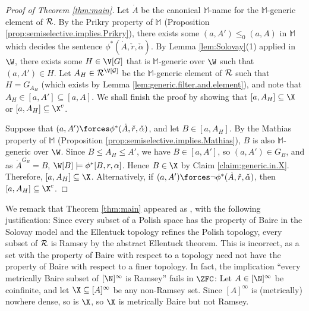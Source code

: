 \documentclass[11pt,reqno]{amsart}
\begin{document}
\begin{proof}[Proof of Theorem \ref{thm:main}]
    Let $\dot{A}$ be the canonical $\mathbb{M}$-name for the $\mathbb{M}$-generic element of $\cal{R}$. By the Prikry property of $\mathbb{M}$ (Proposition \ref{prop:semiselective.implies.Prikry}), there exists some $(a,A') \leq_0 (a,A)$ in $\mathbb{M}$ which decides the sentence $\phi^*(\dot{A},\check{r},\check{\alpha})$. By Lemma \ref{lem:Solovay}(1) applied in $\W$, there exists some $H \in \V[G]$ that is $\mathbb{M}$-generic over $\W$ such that $(a,A') \in H$. Let $A_H \in \cal{R}^{\V[G]}$ be the $\mathbb{M}$-generic element of $\cal{R}$ such that $H = G_{A_H}$ (which exists by Lemma \ref{lem:generic.filter.and.element}), and note that $A_H \in [a,A'] \subseteq [a,A]$. We shall finish the proof by showing that $[a,A_H] \subseteq \X$ or $[a,A_H] \subseteq \X^c$. 

    Suppose that $(a,A') \forces \phi^*(\dot{A},\check{r},\check{\alpha})$, and let $B \in [a,A_H]$. By the Mathias property of $\mathbb{M}$ (Proposition \ref{prop:semiselective.implies.Mathias}), $B$ is also $\mathbb{M}$-generic over $\W$. Since $B \leq A_H \leq A'$, we have $B \in [a,A']$, so $(a,A') \in G_B$, and as $\dot{A}^{G_B} = B$, $\W[B] \models \phi^*[B,r,\alpha]$. Hence $B \in \X$ by Claim \ref{claim:generic.in.X}. Therefore, $[a,A_H] \subseteq \X$. Alternatively, if $(a,A') \forces \neg\phi^*(\dot{A},\check{r},\check{\alpha})$, then $[a,A_H] \subseteq \X^c$.
\end{proof}

We remark that Theorem \ref{thm:main} appeared as \cite[Theorem 6.1]{Y24}, with the following justification: Since every subset of a Polish space has the property of Baire in the Solovay model and the Ellentuck topology refines the Polish topology, every subset of $\cal{R}$ is Ramsey by the abstract Ellentuck theorem. This is incorrect, as a set with the property of Baire with respect to a topology need not have the property of Baire with respect to a finer topology. In fact, the implication ``every metrically Baire subset of $[\N]^\infty$ is Ramsey'' fails in $\ZFC$: Let $A \in [\N]^\infty$ be coinfinite, and let $\X \subseteq [A]^\infty$ be any non-Ramsey set. Since $[A]^\infty$ is (metrically) nowhere dense, so is $\X$, so $\X$ is metrically Baire but not Ramsey.


\printbibliography[title={References}]
\end{document}
